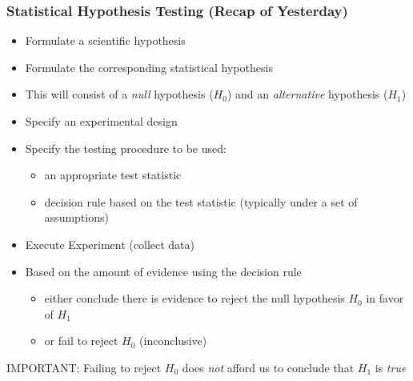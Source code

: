 \documentclass[xcolor=x11names,compress]{beamer}\usepackage[]{graphicx}\usepackage[]{color}
\begin{document}
\begin{frame}
  \frametitle{Statistical Hypothesis Testing (Recap of Yesterday)}
  \begin{itemize}
  \item Formulate a scientific hypothesis
  \item Formulate the corresponding statistical hypothesis
  \item This will consist of a {\it null} hypothesis ($H_0$) and an {\it alternative}
        hypothesis ($H_1$)
  \item Specify an experimental design
  \item Specify the testing procedure to be used:
    \begin{itemize}
    \item an appropriate test statistic
    \item decision rule based on the test statistic (typically under a set of assumptions)
    \end{itemize}
  \item Execute Experiment (collect data)
  \item Based on the amount of evidence using the decision rule
    \begin{itemize}
    \item either conclude there is evidence to reject the null hypothesis  $H_0$ in favor
          of  $H_1$
    \item or fail to reject $H_0$  (inconclusive)
    \end{itemize}
  \end{itemize}
IMPORTANT: Failing to reject $H_0$ does {\it not} afford us to conclude that
$H_1$ is {\it true}
\end{frame}

\end{document}
